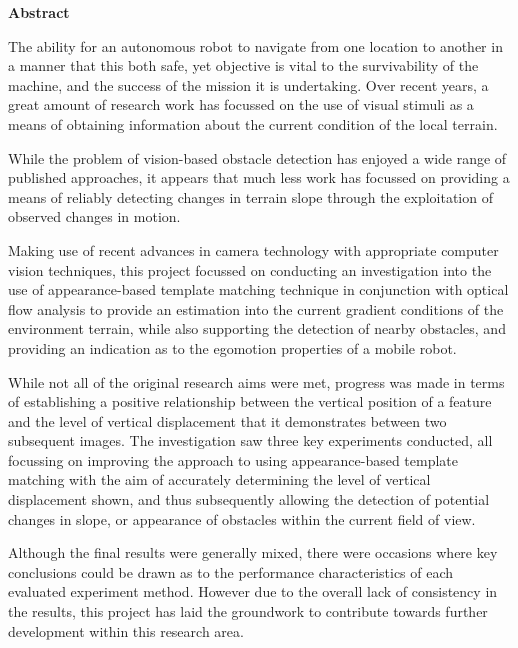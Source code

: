 \thispagestyle{empty}

\begin{center}
    {\LARGE\bf Abstract}
\end{center}


The ability for an autonomous robot to navigate from one location to another in a manner that this both safe, yet objective is vital to the survivability of the machine, and the success of the mission it is undertaking. Over recent years, a great amount of research work has focussed on the use of visual stimuli as a means of obtaining information about the current condition of the local terrain. 

While the problem of vision-based obstacle detection has enjoyed a wide range of published approaches, it appears that much less work has focussed on providing a means of reliably detecting changes in terrain slope through the exploitation of observed changes in motion.

Making use of recent advances in camera technology with appropriate computer vision techniques, this project focussed on conducting an investigation into the use of appearance-based template matching technique in conjunction with optical flow analysis to provide an estimation into the current gradient conditions of the environment terrain, while also supporting the detection of nearby obstacles, and providing an indication as to the egomotion properties of a mobile robot.

While not all of the original research aims were met, progress was made in terms of establishing a positive relationship between the vertical position of a feature and the level of vertical displacement that it demonstrates between two subsequent images. The investigation saw three key experiments conducted, all focussing on improving the approach to using appearance-based template matching with the aim of accurately determining the level of vertical displacement shown, and thus subsequently allowing the detection of potential changes in slope, or appearance of obstacles within the current field of view.

Although the final results were generally mixed, there were occasions where key conclusions could be drawn as to the performance characteristics of each evaluated experiment method. However due to the overall lack of consistency in the results, this project has laid the groundwork to contribute towards further development within this research area.


